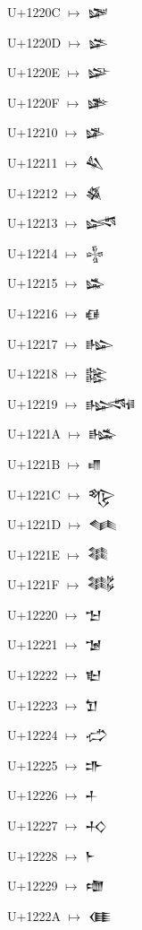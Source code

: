 {\noindent U+1220C  $\mapsto$ {\cufont 𒈌}\par
\noindent U+1220D  $\mapsto$ {\cufont 𒈍}\par
\noindent U+1220E  $\mapsto$ {\cufont 𒈎}\par
\noindent U+1220F  $\mapsto$ {\cufont 𒈏}\par
\noindent U+12210  $\mapsto$ {\cufont 𒈐}\par
\noindent U+12211  $\mapsto$ {\cufont 𒈑}\par
\noindent U+12212  $\mapsto$ {\cufont 𒈒}\par
\noindent U+12213  $\mapsto$ {\cufont 𒈓}\par
\noindent U+12214  $\mapsto$ {\cufont 𒈔}\par
\noindent U+12215  $\mapsto$ {\cufont 𒈕}\par
\noindent U+12216  $\mapsto$ {\cufont 𒈖}\par
\noindent U+12217  $\mapsto$ {\cufont 𒈗}\par
\noindent U+12218  $\mapsto$ {\cufont 𒈘}\par
\noindent U+12219  $\mapsto$ {\cufont 𒈙}\par
\noindent U+1221A  $\mapsto$ {\cufont 𒈚}\par
\noindent U+1221B  $\mapsto$ {\cufont 𒈛}\par
\noindent U+1221C  $\mapsto$ {\cufont 𒈜}\par
\noindent U+1221D  $\mapsto$ {\cufont 𒈝}\par
\noindent U+1221E  $\mapsto$ {\cufont 𒈞}\par
\noindent U+1221F  $\mapsto$ {\cufont 𒈟}\par
\noindent U+12220  $\mapsto$ {\cufont 𒈠}\par
\noindent U+12221  $\mapsto$ {\cufont 𒈡}\par
\noindent U+12222  $\mapsto$ {\cufont 𒈢}\par
\noindent U+12223  $\mapsto$ {\cufont 𒈣}\par
\noindent U+12224  $\mapsto$ {\cufont 𒈤}\par
\noindent U+12225  $\mapsto$ {\cufont 𒈥}\par
\noindent U+12226  $\mapsto$ {\cufont 𒈦}\par
\noindent U+12227  $\mapsto$ {\cufont 𒈧}\par
\noindent U+12228  $\mapsto$ {\cufont 𒈨}\par
\noindent U+12229  $\mapsto$ {\cufont 𒈩}\par
\noindent U+1222A  $\mapsto$ {\cufont 𒈪}\par
}
